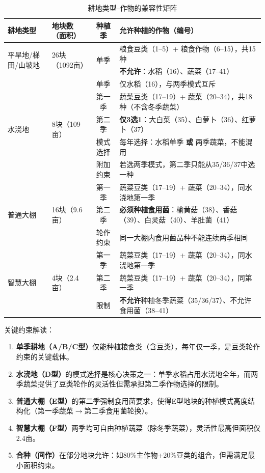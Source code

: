 \documentclass[12pt]{ctexart}
\begin{document}
\begin{table}[H]
\centering
\caption{耕地类型--作物的兼容性矩阵}
\label{tab:compat}
\begin{tabular}{@{}llcp{6cm}@{}}
\toprule
\textbf{耕地类型} & \textbf{地块数（面积）} & \textbf{种植季} & \textbf{允许种植的作物（编号）} \\
\midrule
\multirow{2}{*}{平旱地/梯田/山坡地} & \multirow{2}{*}{26块（1092亩）} & \multirow{2}{*}{单季} &
粮食豆类（1--5）+ 粮食作物（6--15），共15种 \\
& & & \textbf{不允许}：水稻（16）、蔬菜（17--41） \\
\midrule
\multirow{5}{*}{水浇地} & \multirow{5}{*}{8块（109亩）} & 单季 & 仅水稻（16），与两季模式互斥 \\
& & 第一季 & 蔬菜豆类（17--19）+ 蔬菜（20--34），共18种（不含冬季蔬菜） \\
& & 第二季 & \textbf{仅3选1}：大白菜（35）、白萝卜（36）、红萝卜（37） \\
& & 模式选择 & 每年选择：水稻单季 \textbf{或} 两季蔬菜，不能混用 \\
& & 附加约束 & 若选两季模式，第二季只能从35/36/37中选一种 \\
\midrule
\multirow{3}{*}{普通大棚} & \multirow{3}{*}{16块（9.6亩）} & 第一季 & 蔬菜豆类（17--19）+ 蔬菜（20--34），同水浇地第一季 \\
& & 第二季 & \textbf{必须种植食用菌}：榆黄菇（38）、香菇（39）、白灵菇（40）、羊肚菌（41） \\
& & 轮作约束 & 同一大棚内食用菌品种不能连续两季相同 \\
\midrule
\multirow{3}{*}{智慧大棚} & \multirow{3}{*}{4块（2.4亩）} & 第一季 & 蔬菜豆类（17--19）+ 蔬菜（20--34），同水浇地第一季 \\
& & 第二季 & 蔬菜豆类（17--19）+ 蔬菜（20--34），同第一季 \\
& & 限制 & \textbf{不允许}种植冬季蔬菜（35/36/37）、不允许食用菌（38--41） \\
\bottomrule
\end{tabular}
\end{table}

\noindent 关键约束解读：
\begin{enumerate}[label=(\arabic*), leftmargin=*]
    \item \textbf{单季耕地（A/B/C型）}仅能种植粮食类（含豆类），每年仅一季，是豆类轮作约束的关键载体。
    \item \textbf{水浇地（D型）}的模式选择是核心决策之一：单季水稻占用水浇地全年，而两季蔬菜提供了豆类轮作的灵活性但需承担第二季作物选择的限制。
    \item \textbf{普通大棚（E型）}的第二季强制食用菌要求，使得E型地块的种植模式高度结构化（第一季蔬菜$\to$第二季食用菌轮换）。
    \item \textbf{智慧大棚（F型）}两季均可自由种植蔬菜（除冬季蔬菜），灵活性最高但面积仅2.4亩。
    \item \textbf{合种（间作）}在部分地块允许：如80\%主作物+20\%豆类的组合，但需满足最小面积约束。
\end{enumerate}
\end{document}
